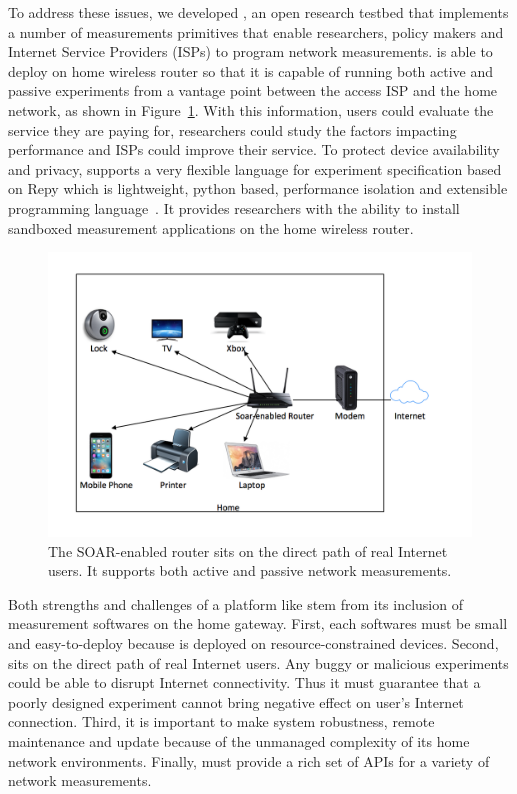 To address these issues, we developed \sysname, an open research testbed that implements a number of measurements primitives that enable researchers, policy makers and Internet Service Providers (ISPs) to program network measurements. \sysname is able to deploy on home wireless router so that it is capable of running both active and passive experiments from a vantage point between the access ISP and the home network, as shown in Figure~\ref{figure:design}. With this information, users could evaluate the service they are paying for, researchers could study the factors impacting performance and ISPs could improve their service. To protect device availability and privacy, \sysname supports a very flexible language for experiment specification based on Repy which is lightweight, python based, performance isolation and extensible programming language~\cite{cappos2010retaining}. It provides researchers with the ability to install sandboxed measurement applications on the home wireless router. 

\begin{figure}%
\centering
\includegraphics[width=0.8\columnwidth]{figure/home-network.png}
\caption{The SOAR-enabled router sits on the direct path of real 
Internet users. It supports both active and passive network measurements.}
\label{figure:design}
\end{figure}

Both strengths and challenges of a platform like \sysname stem from 
its inclusion of measurement softwares on the home gateway. First, each softwares must be small and easy-to-deploy because \sysname is deployed on resource-constrained devices. Second, \sysname sits on the direct path of real Internet users. Any buggy or malicious experiments could be able to disrupt Internet connectivity. Thus it must guarantee that a poorly designed experiment cannot bring negative effect on user's Internet connection. Third, it is important to make system robustness, remote maintenance and update because of the unmanaged complexity of its home network environments. Finally, \sysname must provide a rich set of APIs for a variety of network measurements.


